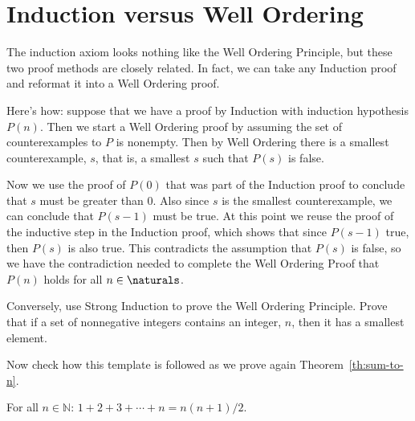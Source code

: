 \section{Induction versus Well Ordering}\label{versusWO}

The induction axiom looks nothing like the Well Ordering Principle, but
these two proof methods are closely related.  In fact, we can take any
Induction proof and reformat it into a Well Ordering proof.

Here's how: suppose that we have a proof by Induction with induction
hypothesis $P(n)$.  Then we start a Well Ordering proof by assuming the
set of counterexamples to $P$ is nonempty.  Then by Well Ordering there is
a smallest counterexample, $s$, that is, a smallest $s$ such that $P(s)$
is false.

Now we use the proof of $P(0)$ that was part of the Induction proof to
conclude that $s$ must be greater than 0.  Also since $s$ is the smallest
counterexample, we can conclude that $P(s-1)$ must be true.  At this point
we reuse the proof of the inductive step in the Induction proof, which
shows that since $P(s-1)$ true, then $P(s)$ is also true.  This
contradicts the assumption that $P(s)$ is false, so we have the
contradiction needed to complete the Well Ordering Proof that $P(n)$ holds
for all $n \in \naturals$.

\begin{notesproblem}
  Conversely, use Strong Induction to prove the Well Ordering Principle.
  \hint Prove that if a set of nonnegative integers contains an integer,
  $n$, then it has a smallest element.
\end{notesproblem}

\iffalse
Now check how this template is followed as we prove again
Theorem~\ref{th:sum-to-n}. 

\begin{theorem*}
For all $n\in\mathbb{N}$:\quad
$
1 + 2 + 3 + \cdots + n = n(n+1)/2
$.
\end{theorem*}

